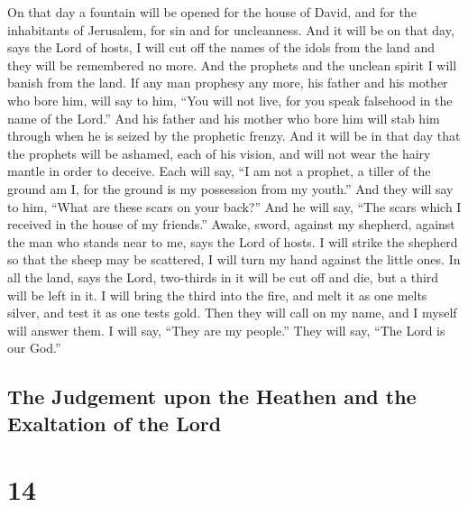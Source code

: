  On that day a fountain will be opened for the house of
David, and for the inhabitants of Jerusalem, for sin and for
uncleanness.  And it will be on that day, says the Lord of
hosts, I will cut off the names of the idols from the land and they will
be remembered no more. And the prophets and the unclean spirit I will
banish from the land.  If any man prophesy any more, his
father and his mother who bore him, will say to him, ``You will not
live, for you speak falsehood in the name of the Lord.'' And his father
and his mother who bore him will stab him through when he is seized by
the prophetic frenzy.  And it will be in that day that the
prophets will be ashamed, each of his vision, and will not wear the
hairy mantle in order to deceive.  Each will say, ``I am not
a prophet, a tiller of the ground am I, for the ground is my possession
from my youth.''  And they will say to him, ``What are these
scars on your back?'' And he will say, ``The scars which I received in
the house of my friends.''  Awake, sword, against my
shepherd, against the man who stands near to me, says the Lord of hosts.
I will strike the shepherd so that the sheep may be scattered, I will
turn my hand against the little ones.  In all the land, says
the Lord, two-thirds in it will be cut off and die, but a third will be
left in it.  I will bring the third into the fire, and melt
it as one melts silver, and test it as one tests gold. Then they will
call on my name, and I myself will answer them. I will say, ``They are
my people.'' They will say, ``The Lord is our God.''

\hypertarget{the-judgement-upon-the-heathen-and-the-exaltation-of-the-lord}{%
\subsection{The Judgement upon the Heathen and the Exaltation of the
Lord}\label{the-judgement-upon-the-heathen-and-the-exaltation-of-the-lord}}

\hypertarget{section-13}{%
\section{14}\label{section-13}}

